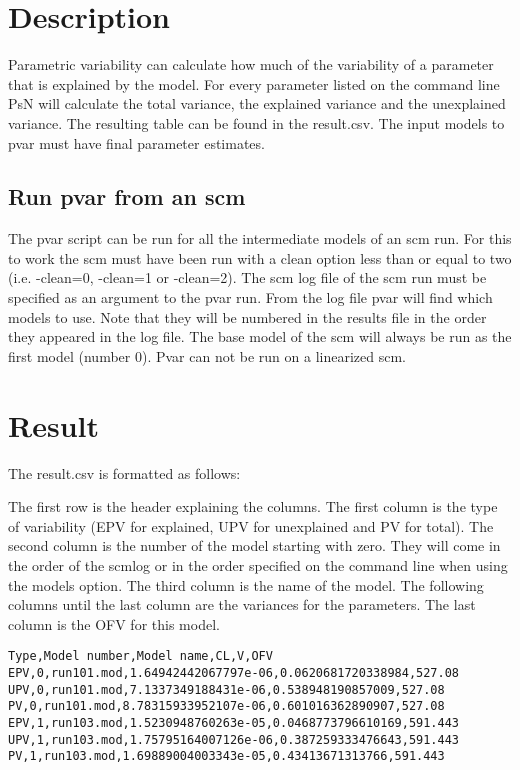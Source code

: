 \section{Description}

Parametric variability can calculate how much of the variability of a parameter that is explained by the model. For every parameter listed on the command line PsN will calculate the total variance, the explained variance and the unexplained variance. The resulting table can be found in the result.csv. The input models to pvar must have final parameter estimates.

\subsection{Run pvar from an scm}
The pvar script can be run for all the intermediate models of an scm run. For this to work the scm must have been run with a clean option less than or equal to two (i.e. -clean=0, -clean=1 or -clean=2). The scm log file of the scm run must be specified as an argument to the pvar run. From the log file pvar will find which models to use. Note that they will be numbered in the results file in the order they appeared in the log file. The base model of the scm will always be run as the first model (number 0). Pvar can not be run on a linearized scm. 

\section{Result}

The result.csv is formatted as follows:

The first row is the header explaining the columns.
The first column is the type of variability (EPV for explained, UPV for unexplained and PV for total). The second column is the number of the model starting with zero. They will come in the order of the scmlog or in the order specified on the command line when using the models option. The third column is the name of the model. The following columns until the last column are the variances for the parameters. The last column is the OFV for this model.

\begin{verbatim}
Type,Model number,Model name,CL,V,OFV
EPV,0,run101.mod,1.64942442067797e-06,0.0620681720338984,527.08
UPV,0,run101.mod,7.1337349188431e-06,0.538948190857009,527.08
PV,0,run101.mod,8.78315933952107e-06,0.601016362890907,527.08
EPV,1,run103.mod,1.5230948760263e-05,0.0468773796610169,591.443
UPV,1,run103.mod,1.75795164007126e-06,0.387259333476643,591.443
PV,1,run103.mod,1.69889004003343e-05,0.43413671313766,591.443
\end{verbatim}

